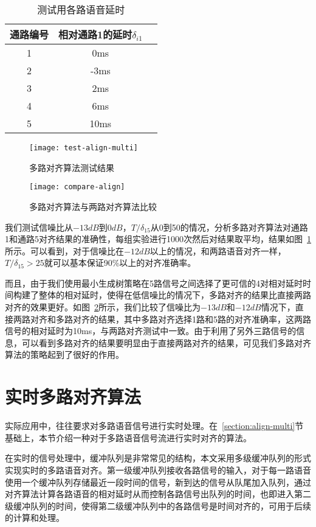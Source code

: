 \begin{table}
\centering
\caption{测试用各路语音延时}
\label{tab:delays}
\begin{tabular}{ccc}
\toprule[1.5pt]
通路编号 & 相对通路1的延时$\delta_{i1}$ \\ \midrule[1pt]
1 & 0ms \\
2 & -3ms \\
3 & 2ms \\
4 & 6ms \\
5 & 10ms \\ \bottomrule[1.5pt]
\end{tabular}
\end{table}

\begin{figure}
\centering
\texttt{[image: test-align-multi]}
\caption{多路对齐算法测试结果\label{fig:test-align-multi}}
\end{figure}

\begin{figure}
\centering
\texttt{[image: compare-align]}
\caption{多路对齐算法与两路对齐算法比较\label{fig:compare-align}}
\end{figure}

我们测试信噪比从$-13dB$到$0dB$，$T/\delta_{15}$从0到50的情况，分析多路对齐算法对通路1和通路5对齐结果的准确性，每组实验进行1000次然后对结果取平均，结果如图~\ref{fig:test-align-multi}所示。可以看到，对于信噪比在$-12dB$以上的情况，和两路语音对齐一样，$T/\delta_{15} > 25$就可以基本保证90\%以上的对齐准确率。

而且，由于我们使用最小生成树策略在5路信号之间选择了更可信的4对相对延时时间构建了整体的相对延时，使得在低信噪比的情况下，多路对齐的结果比直接两路对齐的效果更好。如图~\ref{fig:compare-align}所示，我们比较了信噪比为$-13dB$和$-12dB$情况下，直接两路对齐和多路对齐的结果，其中多路对齐选择1路和5路的对齐准确率，这两路信号的相对延时为10ms，与两路对齐测试中一致。由于利用了另外三路信号的信息，可以看到多路对齐的结果要明显由于直接两路对齐的结果，可见我们多路对齐算法的策略起到了很好的作用。

\section{实时多路对齐算法} \label{section:realtime-align}

实际应用中，往往要求对多路语音信号进行实时处理。在~\ref{section:align-multi}节基础上，本节介绍一种对于多路语音信号流进行实时对齐的算法。

在实时的信号处理中，缓冲队列是非常常见的结构，本文采用多级缓冲队列的形式实现实时的多路语音对齐。第一级缓冲队列接收各路信号的输入，对于每一路语音使用一个缓冲队列存储最近一段时间的信号，新到达的信号从队尾加入队列，通过对齐算法计算各路语音的相对延时从而控制各路信号出队列的时间，也即进入第二级缓冲队列的时间，使得第二级缓冲队列中的各路信号是时间对齐的，可用于后续的计算和处理。

